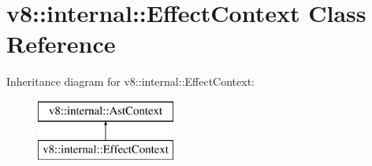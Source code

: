 \hypertarget{classv8_1_1internal_1_1_effect_context}{}\section{v8\+:\+:internal\+:\+:Effect\+Context Class Reference}
\label{classv8_1_1internal_1_1_effect_context}
Inheritance diagram for v8\+:\+:internal\+:\+:Effect\+Context\+:\begin{figure}[H]
\begin{center}
\leavevmode
\includegraphics[height=2.000000cm]{classv8_1_1internal_1_1_effect_context}
\end{center}
\end{figure}
